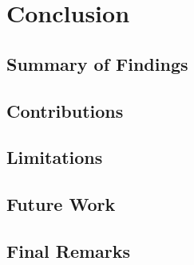 \chapter{Conclusion}
\label{chapter:conclusion}


\section{Summary of Findings}

\section{Contributions}

\section{Limitations}

\section{Future Work}

\section{Final Remarks}
